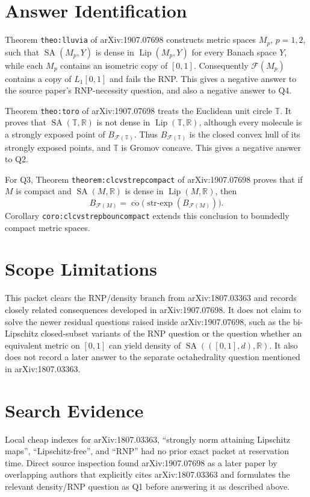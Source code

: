 \documentclass[11pt]{article}
\newcommand{\SA}{\operatorname{SA}}
\newcommand{\Lip}{\operatorname{Lip}}
\newcommand{\co}{\operatorname{co}}
\newcommand{\strexp}{\operatorname{str\mbox{-}exp}}
\newcommand{\F}{\mathcal F}
\newcommand{\R}{\mathbb R}
\begin{document}
\section*{Answer Identification}

Theorem \texttt{theo:lluvia} of arXiv:1907.07698 constructs metric spaces
\(M_p\), \(p=1,2\), such that \(\SA(M_p,Y)\) is dense in \(\Lip(M_p,Y)\) for
every Banach space \(Y\), while each \(M_p\) contains an isometric copy of
\([0,1]\).  Consequently \(\F(M_p)\) contains a copy of \(L_1[0,1]\) and fails
the RNP.  This gives a negative answer to the source paper's RNP-necessity
question, and also a negative answer to Q4.

Theorem \texttt{theo:toro} of arXiv:1907.07698 treats the Euclidean unit
circle \(\mathbb T\).  It proves that \(\SA(\mathbb T,\R)\) is not dense in
\(\Lip(\mathbb T,\R)\), although every molecule is a strongly exposed point of
\(B_{\F(\mathbb T)}\).  Thus \(B_{\F(\mathbb T)}\) is the closed convex hull of
its strongly exposed points, and \(\mathbb T\) is Gromov concave.  This gives a
negative answer to Q2.

For Q3, Theorem \texttt{theorem:clcvstrepcompact} of arXiv:1907.07698 proves
that if \(M\) is compact and \(\SA(M,\R)\) is dense in \(\Lip(M,\R)\), then
\[
  B_{\F(M)}
  =
  \overline{\co}\bigl(\strexp(B_{\F(M)})\bigr).
\]
Corollary \texttt{coro:clcvstrepbouncompact} extends this conclusion to
boundedly compact metric spaces.

\section*{Scope Limitations}

This packet clears the RNP/density branch from arXiv:1807.03363 and records
closely related consequences developed in arXiv:1907.07698.  It does not claim
to solve the newer residual questions raised inside arXiv:1907.07698, such as
the bi-Lipschitz closed-subset variants of the RNP question or the question
whether an equivalent metric on \([0,1]\) can yield density of
\(\SA(([0,1],d),\R)\).  It also does not record a later answer to the separate
octahedrality question mentioned in arXiv:1807.03363.

\section*{Search Evidence}

Local cheap indexes for arXiv:1807.03363, ``strongly norm attaining Lipschitz
maps'', ``Lipschitz-free'', and ``RNP'' had no prior exact packet at
reservation time.  Direct source inspection found arXiv:1907.07698 as a later
paper by overlapping authors that explicitly cites arXiv:1807.03363 and
formulates the relevant density/RNP question as Q1 before answering it as
described above.
\end{document}
